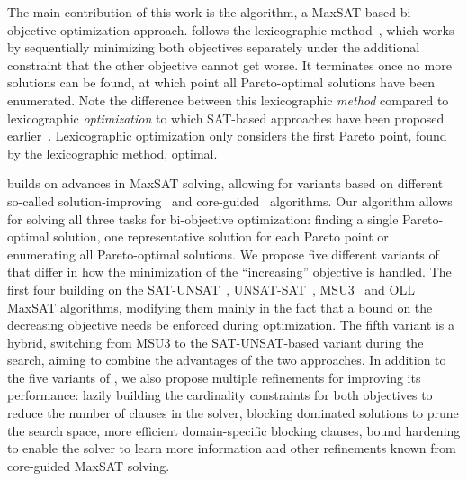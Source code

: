 The main contribution of this work is the \algname{} algorithm, a MaxSAT-based bi-objective optimization approach.
\algname{} follows the lexicographic method~\autocite{survey}, which works by sequentially minimizing both objectives separately under the additional constraint that the other objective cannot get worse.
It terminates once no more solutions can be found, at which point all Pareto-optimal solutions have been enumerated.
Note the difference between this lexicographic \emph{method} compared to lexicographic \emph{optimization} to which SAT-based approaches have been proposed earlier~\autocite{DBLP:conf/ijcai/ArgelichLS09,DBLP:journals/amai/Marques-SilvaAGL11}.
Lexicographic optimization only considers the first Pareto point, found by the lexicographic method, optimal.

\algname{} builds on advances in MaxSAT solving, allowing for variants based on different so-called solution-improving~\autocites{handbook2-maxsat,DBLP:journals/jsat/BerreP10,DBLP:journals/jsat/EenS06} and core-guided~\autocites{DBLP:journals/corr/abs-0712-1097,DBLP:conf/sat/AnsoteguiBL09,DBLP:conf/cp/MorgadoDM14,DBLP:journals/jsat/IgnatievMM19} algorithms.
Our algorithm allows for solving all three tasks for bi-objective optimization:
finding a single Pareto-optimal solution, one representative solution for each Pareto point or enumerating all Pareto-optimal solutions.
We propose five different variants of \algname{} that differ in how the minimization of the ``increasing'' objective is handled.
The first four building on the SAT-UNSAT~\autocite{DBLP:journals/jsat/BerreP10}, UNSAT-SAT~\autocite{DBLP:conf/sat/FuM06}, MSU3~\autocite{DBLP:journals/corr/abs-0712-1097} and OLL~\autocite{DBLP:conf/cp/MorgadoDM14} MaxSAT algorithms, modifying them mainly in the fact that a bound on the decreasing objective needs be enforced during optimization.
The fifth variant is a hybrid, switching from MSU3 to the SAT-UNSAT-based variant during the search, aiming to combine the advantages of the two approaches.
In addition to the five variants of \algname{}, we also propose multiple refinements for improving its performance:
lazily building the cardinality constraints for both objectives to reduce the number of clauses in the solver, blocking dominated solutions to prune the search space, more efficient domain-specific blocking clauses, bound hardening to enable the solver to learn more information and other refinements known from core-guided MaxSAT solving.

